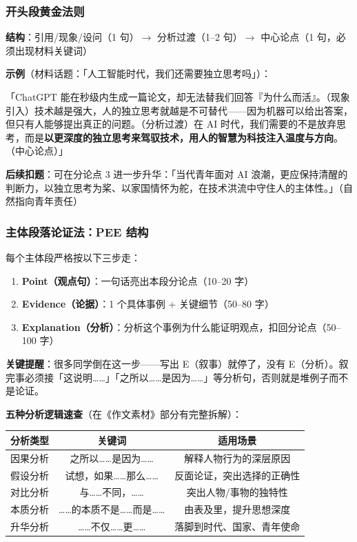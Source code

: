 \subsubsection{开头段黄金法则}

\textbf{结构}：引用/现象/设问（1 句）$\to$ 分析过渡（1--2 句）$\to$ 中心论点（1 句，必须出现材料关键词）

\textbf{示例}（材料话题：「人工智能时代，我们还需要独立思考吗」）：

「ChatGPT 能在秒级内生成一篇论文，却无法替我们回答『为什么而活』。（现象引入）技术越是强大，人的独立思考就越是不可替代——因为机器可以给出答案，但只有人能够提出真正的问题。（分析过渡）在 AI 时代，我们需要的不是放弃思考，而是\textbf{以更深度的独立思考来驾驭技术，用人的智慧为科技注入温度与方向}。（中心论点）」

\textbf{后续扣题}：可在分论点 3 进一步升华：「当代青年面对 AI 浪潮，更应保持清醒的判断力，以独立思考为桨、以家国情怀为舵，在技术洪流中守住人的主体性。」（自然指向青年责任）

\subsubsection{主体段落论证法：PEE 结构}

每个主体段严格按以下三步走：

\begin{enumerate}
  \item \textbf{Point（观点句）}：一句话亮出本段分论点（10--20 字）
  \item \textbf{Evidence（论据）}：1 个具体事例 + 关键细节（50--80 字）
  \item \textbf{Explanation（分析）}：分析这个事例为什么能证明观点，扣回分论点（50--100 字）
\end{enumerate}

\textbf{关键提醒}：很多同学倒在这一步——写出 E（叙事）就停了，没有 E（分析）。叙完事必须接「这说明……」「之所以……是因为……」等分析句，否则就是堆例子而不是论证。

\textbf{五种分析逻辑速查}（在《作文素材》部分有完整拆解）：

\begin{center}
\begin{tabular}{c|c|c}
\textbf{分析类型} & \textbf{关键词} & \textbf{适用场景} \\ \hline
因果分析 & 之所以……是因为…… & 解释人物行为的深层原因 \\
假设分析 & 试想，如果……那么…… & 反面论证，突出选择的正确性 \\
对比分析 & 与……不同，…… & 突出人物/事物的独特性 \\
本质分析 & ……的本质不是……而是…… & 由表及里，提升思想深度 \\
升华分析 & ……不仅……更…… & 落脚到时代、国家、青年使命 \\
\end{tabular}
\end{center}

